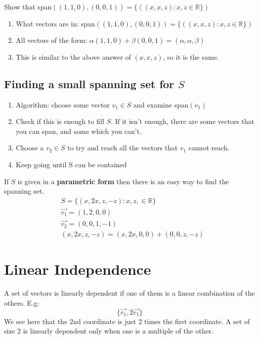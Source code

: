 \documentclass[11pt]{book}
\begin{document}
{{	Show that span$\left(\left(1,1,0\right), \left(0,0,1\right)\right)=\lbrace(\left(x,x,z\right):x,z\in\mathbb{R}\rbrace)$
}
\begin{enumerate}
	\item{What vectors are in: span$\left( \left(1,1,0\right), \left(0,0,1\right)\right)=\lbrace( \left(x,x,z\right) :x,z\in\mathbb{R} \rbrace)$}
	\item{All vectors of the form: $\alpha\left(1,1,0\right)+\beta\left(0,0,1\right)=\left(\alpha,\alpha,\beta\right)$}
	\item{This is similar to the above answer of $\left(x,x,z\right)$, so it is the same.}
\end{enumerate}
\subsection{Finding a small spanning set for $S$}
\begin{enumerate}
	\item{Algorithm: choose some vector $v_{1}\in S$ and examine span$\left(v_{1}\right)$}
	\item{Check if this is enough to fill $S$. If it isn't enough, there are some vectors that you can span, and some which you can't.}	
	\item{Choose a $v_{2}\in S$ to try and reach all the vectors that $v_{1}$ cannot reach.}
	\item{Keep going until S can be contained}
\end{enumerate}
\par{If $S$ is given in a \textbf{parametric form} then there is an easy way to find the spanning set.}
\begin{align*}
	& S=\lbrace\left(x,2x,z,-z\right): x,z,\in \mathbb{R}\rbrace \\
	& \vec{v_{1}}=\left(1,2,0,0\right) \\
	& \vec{v_{2}}=\left(0,0,1,-1\right) \\
	& \left(x,2x,z,-z\right)=\left(x,2x,0,0\right)+\left(0,0,z,-z\right)
\end{align*}
\section{Linear Independence}
\par{A set of vectors is linearly dependent if one of them is a linear combination of the others. E.g: \[
\lbrace\vec{v_{1}}, 2\vec{v_{1}}\rbrace
\] We see here that the 2nd coordinate is just 2 times the first coordinate. A set of size 2 is linearly dependent only when one is a multiple of the other.}
}
\end{document}
